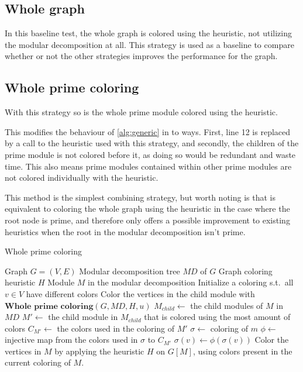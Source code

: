 \documentclass[a4paper]{article}
\begin{document}
\subsection{Whole graph}

In this baseline test, the whole graph is colored using the heuristic, not
utilizing the modular decomposition at all. This strategy is used as a baseline
to compare whether or not the other strategies improves the performance for the
graph.

\subsection{Whole prime coloring}

With this strategy so is the whole prime module colored using the heuristic. 

This modifies the behaviour of \autoref{alg:generic} in to ways. First, line 12 is replaced by a
call to the heuristic used with this strategy, and secondly, the children of the prime
module is not colored before it, as doing so would be redundant and waste time.
This also means prime modules contained within other prime modules are not
colored individually with the heuristic.

This method is the simplest combining strategy, but worth noting is that is
equivalent to coloring the whole graph using the heuristic in the case where the
root node is prime, and therefore only offers a possible improvement to existing
heuristics when the root in the modular decomposition isn't prime.

\begin{algorithm}[H]
  \caption{Whole prime coloring}
  \label{alg:wpc}
  \begin{algorithmic}[1]
    \REQUIRE Graph $G = (V,E)$ 
    \REQUIRE Modular decomposition tree $MD$ of $G$
    \REQUIRE Graph coloring heuristic $H$
    \REQUIRE Module $M$ in the modular decomposition
    \STATE Initialize a coloring s.t.\ all $v \in V$
           have different colors
            \STATE Color the vertices in the child module with \\
            $\textbf{Whole prime coloring}(G,MD,H,u)$
        \ENDFOR
          \STATE $M_{child} \leftarrow $ the child modules of $M$ in $MD$
          \STATE $M' \leftarrow $ the child module in $M_{child}$ that is colored using the most amount of colors
          \STATE $C_{M'} \leftarrow $ the colors used in the coloring of $M'$
             \STATE $\sigma \leftarrow $ coloring of $m$
             \STATE $\phi \leftarrow $ injective map from the colors used in $\sigma$ to $C_{M'}$
                \STATE $\sigma(v)\leftarrow \phi(\sigma(v))$  
             \ENDFOR
          \ENDFOR
        \ENDIF
    \ELSE
        \STATE Color the vertices in $M$ by applying the heuristic $H$ on $G[M]$, using colors present in the current coloring of $M$.
    \ENDIF
  \end{algorithmic}
\end{algorithm}
\end{document}
